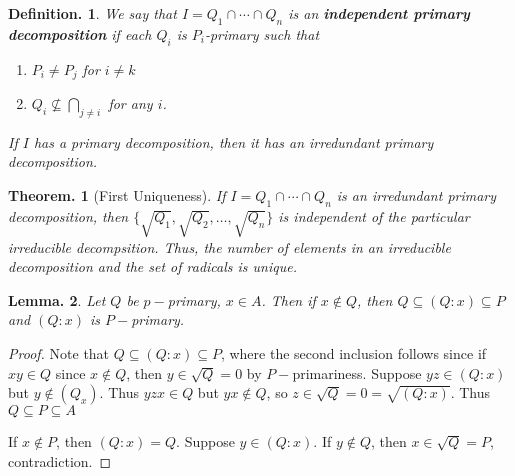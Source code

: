 \documentclass[11pt, a4paper]{memoir}
\theoremstyle{change}
\newtheorem{theorem}{Theorem.}[section]
\newtheorem{lemma}[theorem]{Lemma.}
\theoremstyle{plain}
\theoremstyle{nonumberplain}
\newtheorem{definition}{Definition.}
\newtheorem{proof}{Proof}
\numberwithin{equation}{section}
\begin{document}
\begin{definition}
    We say that $I=Q_1\cap\cdots\cap Q_n$ is an \textbf{independent primary decomposition} if each $Q_i$ is $P_i$-primary such that
    \begin{enumerate}[nolistsep]
        \item $P_i\neq P_j$ for $i\neq k$
        \item $Q_i\nsubseteq\bigcap_{j\neq i}$ for any $i$.
    \end{enumerate}
    If $I$ has a primary decomposition, then it has an irredundant primary decomposition.
\end{definition}
\begin{theorem}[First Uniqueness]
    If $I=Q_1\cap\cdots\cap Q_n$ is an irredundant primary decomposition, then $\{\sqrt{Q_1},\sqrt{Q_2},\ldots,\sqrt{Q_n}\}$ is independent of the particular irreducible decompsition.
    Thus, the number of elements in an irreducible decomposition and the set of radicals is unique.
\end{theorem}
\begin{lemma}
    Let $Q$ be $p-$primary, $x\in A$.
    Then if $x\notin Q$, then $Q\subseteq(Q:x)\subseteq P$ and $(Q:x)$ is $P-$primary.
\end{lemma}
\begin{proof}
    Note that $Q\subseteq(Q:x)\subseteq P$, where the second inclusion follows since if $xy\in Q$ since $x\notin Q$, then $y\in\sqrt{Q}=0$ by $P-$primariness.
    Suppose $yz\in(Q:x)$ but $y\notin(Q_x)$.
    Thus $yzx\in Q$ but $yx\notin Q$, so $z\in\sqrt{Q}=0=\sqrt{(Q:x)}$.
    Thus $Q\subseteq P\subseteq A$

    If $x\notin P$, then $(Q:x)=Q$.
    Suppose $y\in(Q:x)$.
    If $y\notin Q$, then $x\in\sqrt{Q}=P$, contradiction.
\end{proof}
\end{document}
